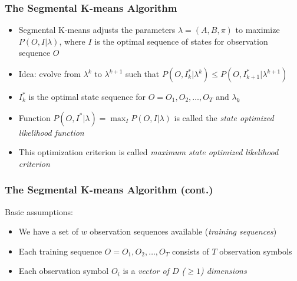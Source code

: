 \documentclass{beamer}
\begin{document}
\begin{frame} \frametitle{The Segmental K-means Algorithm}

  \begin{itemize}
  \item Segmental K-means adjusts the parameters $\lambda = (A, B, \pi)$ to
    maximize $P(O,I|\lambda)$, where $I$ is the optimal sequence of states for
    observation sequence $O$
  \item Idea: evolve from $\lambda^k$ to $\lambda^{k+1}$ such that
    $P(O,I^*_k|\lambda^k) \leq P(O,I^*_{k+1}|\lambda^{k+1})$
  \item $I^*_k$ is the optimal state sequence for $O = O_1, O_2, \dotsc, O_T$
    and $\lambda_k$
  \item Function $P(O,I^*|\lambda) = \max_I P(O,I|\lambda)$ is called the
    \emph{state optimized likelihood function}
  \item This optimization criterion is called \emph{maximum state optimized
      likelihood criterion}
  \end{itemize}
  
\end{frame}


\begin{frame} \frametitle{The Segmental K-means Algorithm (cont.)}

  Basic assumptions:
  \begin{itemize}
  \item We have a set of $w$ observation sequences available (\emph{training
      sequences})
  \item Each training sequence $O = O_1, O_2, \dotsc, O_T$ consists of $T$
    observation symbols
  \item Each observation symbol $O_i$ is a \emph{vector of $D$ ($\geq 1$) dimensions}
  \end{itemize}
  
\end{frame}

\end{document}
